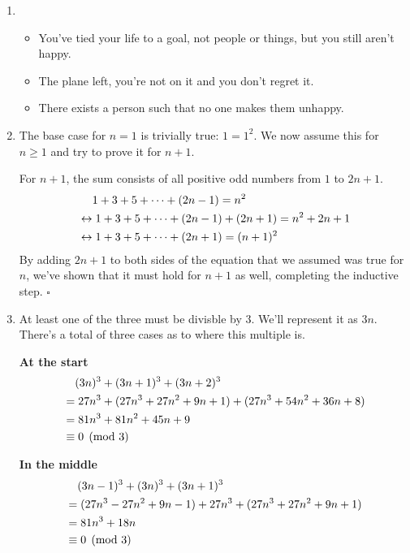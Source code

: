\documentclass[12pt]{article}
\begin{document}
\begin{enumerate}
      \item \begin{itemize}
                  \item You've tied your life to a goal, not people or things, but you still aren't happy.
                  \item The plane left, you're not on it and you don't regret it.
                  \item There exists a person such that no one makes them unhappy.
            \end{itemize}
      \item The base case for $n=1$ is trivially true: $1=1^2$.
            We now assume this for $n \ge 1$ and try to prove it for $n+1$.

            For $n+1$, the sum consists of all positive odd numbers from $1$ to $2n+1$.
            \begin{align*}
                   & \hphantom{\leftrightarrow{}} 1+3+5+ \cdots + (2n-1) = n^2      \\
                   & \leftrightarrow 1+3+5+ \cdots + (2n-1) + (2n+1) = n^2 + 2n + 1 \\
                   & \leftrightarrow 1+3+5+ \cdots + (2n+1) = (n+1)^2
            \end{align*}
            By adding $2n+1$ to both sides of the equation that we assumed was true
            for $n$, we've shown that it must hold for $n+1$ as well,
            completing the inductive step. $\square$
      \item At least one of the three must be divisble by $3$.
            We'll represent it as $3n$.
            There's a total of three cases as to where this multiple is.

            \textbf{At the start}
            \begin{align*}
                   & \hphantom{={}} (3n)^3+(3n+1)^3+(3n+2)^3        \\
                   & = 27n^3+(27n^3+27n^2+9n+1)+(27n^3+54n^2+36n+8) \\
                   & = 81n^3+81n^2+45n+9                            \\
                   & \equiv 0 \pmod 3
            \end{align*}

            \textbf{In the middle}
            \begin{align*}
                   & \hphantom{={}} (3n-1)^3+(3n)^3+(3n+1)^3       \\
                   & = (27n^3-27n^2+9n-1)+27n^3+(27n^3+27n^2+9n+1) \\
                   & = 81n^3+18n                                   \\
                   & \equiv 0 \pmod 3
            \end{align*}


\end{enumerate}
\end{document}
